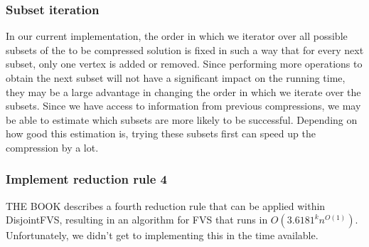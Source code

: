 \subsubsection{Subset iteration}
In our current implementation, the order in which we iterator over all possible subsets of the to be compressed solution is fixed in such a way that for every next subset, only one vertex is added or removed. Since performing more operations to obtain the next subset will not have a significant impact on the running time, they may be a large advantage in changing the order in which we iterate over the subsets. Since we have access to information from previous compressions, we may be able to estimate which subsets are more likely to be successful. Depending on how good this estimation is, trying these subsets first can speed up the compression by a lot.

\subsubsection{Implement reduction rule 4}
THE BOOK describes a fourth reduction rule that can be applied within {\sc DisjointFVS}, resulting in an algorithm for FVS that runs in $O(3.6181^kn^{O(1)})$.  Unfortunately, we didn't get to implementing this in the time available.
